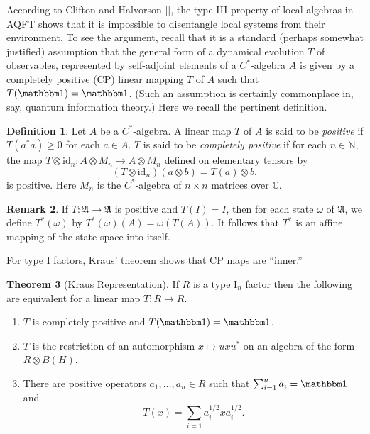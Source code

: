 \documentclass[12pt]{article}
\theoremstyle{definition}
\newtheorem{thm}{Theorem}[section]
\theoremstyle{definition}
\newtheorem{defn}[thm]{Definition}
\newtheorem{note}[thm]{Remark}
\theoremstyle{remark}
\def\7#1{{\mathbb #1}}
\def\8#1{{\mathbbm #1}}
\def\al#1{{\mathfrak #1}}
\def\om{\omega} \def\Om{\Omega} \def\dd{\partial} \def\D{\Delta}
\def\id{\mathrm{id}}
\begin{document}
According to Clifton and Halvorson [\citeyear{clif}], the type III
property of local algebras in AQFT shows that it is impossible to
disentangle local systems from their environment.  To see the
argument, recall that it is a standard (perhaps somewhat justified)
assumption that the general form of a dynamical evolution $T$ of
observables, represented by self-adjoint elements of a $C^*$-algebra
$A$ is given by a completely positive (CP) linear mapping $T$ of $A$
such that $T(\81 )=\81 $.  (Such an assumption is certainly
commonplace in, say, quantum information theory.)  Here we recall the
pertinent definition.

\begin{defn} Let $A$ be a $C^*$-algebra.  A linear map
  $T$ of $A$ is said to be \emph{positive} if
  $T(a^*a)\geq 0$ for each $a\in A$.  $T$ is said to be
  \emph{completely positive} if for each $n\in \7N$,
  the map $T\otimes \id _n:A\otimes M_n\to A\otimes
  M_n$ defined on elementary tensors by
$$ (T\otimes \id _n)(a\otimes b)=T(a)\otimes b ,$$
is positive.  Here $M_n$ is the $C^*$-algebra of
$n\times n$ matrices over $\7C$.  \end{defn}

\begin{note} If $T:\al A\to \al A$ is positive and
  $T(I)=I$, then for each state $\om$ of $\al A$, we
  define $T^*(\om )$ by $T^*(\om )(A)=\om (T(A))$.  It
  follows that $T^*$ is an affine mapping of the state
  space into itself.  \end{note}  

%

For type I factors, Kraus' theorem \cite{kraus} shows
that CP maps are ``inner.''
\begin{thm}[Kraus Representation] If $R$ is a type I$_n$ factor then
  the following are equivalent for a linear map $T:R\to R$.
\begin{enumerate}
\item $T$ is completely positive and $T(\81 )=\81 $.
\item $T$ is the restriction of an automorphism $x\mapsto uxu^*$ on an
  algebra of the form $R\otimes B(H)$.
\item There are positive operators $a_1,\dots ,a_n\in R$ such that
  $\sum _{i=1}^{n}a_i=\81$ and
  \begin{equation} T(x)=\sum _{i=1}a_i^{1/2}xa_i^{1/2} .\label{kraus} \end{equation}
\end{enumerate}
\end{thm}
\end{document}
